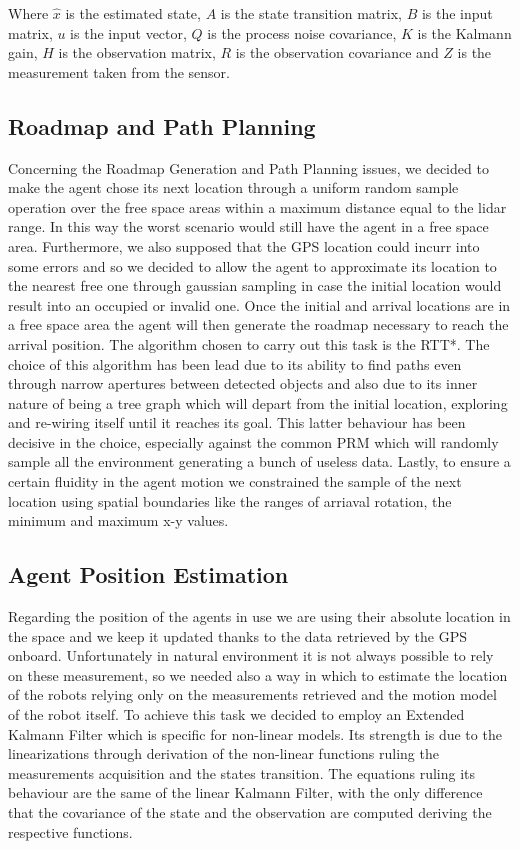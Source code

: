 \documentclass[twocolumn, a4paper]{article}
\begin{document}
Where $\hat{x}$ is the estimated state, $A$ is the state transition matrix,
$B$ is the input matrix, $u$ is the input vector, $Q$ is the process noise
covariance, $K$ is the Kalmann gain, $H$ is the observation matrix,
$R$ is the observation covariance and $Z$ is the measurement taken from the
sensor.

\subsection{Roadmap and Path Planning}
Concerning the Roadmap Generation and Path Planning issues, we decided to
make the agent chose its next location through a uniform random sample
operation over the free space areas within a maximum distance equal to the
lidar range. In this way the worst scenario would still have the agent in
a free space area. Furthermore, we also supposed that the GPS location could
incurr into some errors and so we decided to allow the agent to approximate
its location to the nearest free one through gaussian sampling in case the 
initial location would result into an occupied or invalid one. Once the
initial and arrival locations are in a free space area the agent will then
generate the roadmap necessary to reach the arrival position. The algorithm 
chosen to carry out this task is the RTT*. The choice of this algorithm has
been lead due to its ability to find paths even through narrow apertures
between detected objects and also due to its inner nature of being a tree
graph which will depart from the initial location, exploring and re-wiring
itself until it reaches its goal. This latter behaviour has been decisive in
the choice, especially against the common PRM which will randomly sample all
the environment generating a bunch of useless data. Lastly, to ensure a
certain fluidity in the agent motion we constrained the sample of the
next location using spatial boundaries like the ranges of arriaval rotation,
the minimum and maximum x-y values.

\subsection{Agent Position Estimation}
Regarding the position of the agents in use we are using their absolute
location in the space and we keep it updated thanks to the data retrieved
by the GPS onboard. Unfortunately in natural environment it is not always
possible to rely on these measurement, so we needed also a way in which to
estimate the location of the robots relying only on the measurements retrieved
and the motion model of the robot itself. To achieve this task we decided
to employ an Extended Kalmann Filter which is specific for non-linear models.
Its strength is due to the linearizations through derivation of the non-linear
functions ruling the measurements acquisition and the states transition.
The equations ruling its behaviour are the same of the linear Kalmann Filter,
with the only difference that the covariance of the state and the observation
are computed deriving the respective functions.
\end{document}
